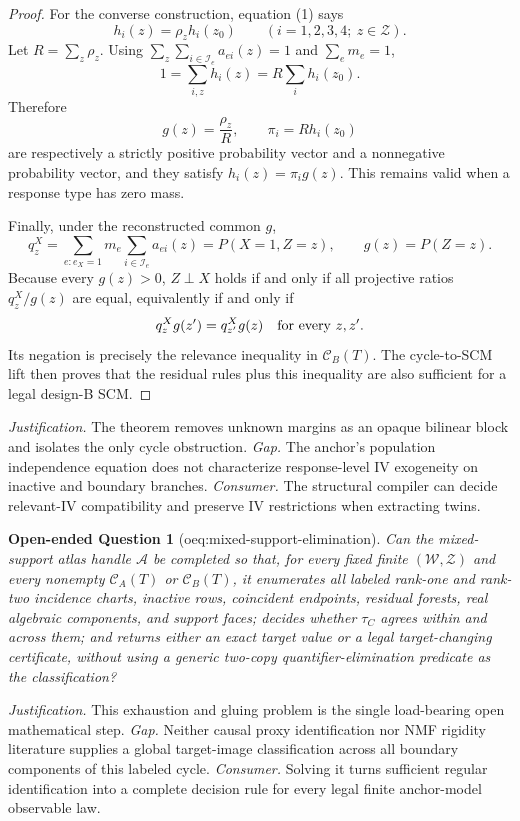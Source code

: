 \documentclass{article}
\newtheorem{openendedquestion}{Open-ended Question}
\begin{document}
\begin{proof}
For the converse construction, equation (1) says
\[
h_i(z)=\rho_z h_i(z_0)\qquad(i=1,2,3,4;\ z\in\mathcal Z).
\]
Let \(R=\sum_z\rho_z\).  Using \(\sum_z\sum_{i\in\mathcal I_e}a_{ei}(z)=1\) and \(\sum_em_e=1\),
\[
1=\sum_{i,z}h_i(z)=R\sum_i h_i(z_0).
\]
Therefore
\[
g(z)=\frac{\rho_z}{R},
\qquad
\pi_i=R h_i(z_0)
\]
are respectively a strictly positive probability vector and a nonnegative probability vector, and they satisfy \(h_i(z)=\pi_i g(z)\).  This remains valid when a response type has zero mass.

Finally, under the reconstructed common \(g\),
\[
q^X_z=\sum_{e:e_X=1}m_e\sum_{i\in\mathcal I_e}a_{ei}(z)
=P(X=1,Z=z),
\qquad g(z)=P(Z=z).
\]
Because every \(g(z)>0\), \(Z\perp X\) holds if and only if all projective ratios \(q^X_z/g(z)\) are equal, equivalently if and only if
\[
q^X_zg(z')=q^X_{z'}g(z)
\quad\hbox{for every }z,z'.
\]
Its negation is precisely the relevance inequality in \(\mathcal C_B(T)\).  The cycle-to-SCM lift then proves that the residual rules plus this inequality are also sufficient for a legal design-B SCM.
\end{proof}
\par\smallskip\noindent \textit{Justification.} The theorem removes unknown margins as an opaque bilinear block and isolates the only cycle obstruction. \textit{Gap.} The anchor's population independence equation does not characterize response-level IV exogeneity on inactive and boundary branches. \textit{Consumer.} The structural compiler can decide relevant-IV compatibility and preserve IV restrictions when extracting twins.

\begin{openendedquestion}[oeq:mixed-support-elimination]\label{oeq:mixed-support-elimination}
Can the mixed-support atlas handle \(\mathscr A\) be completed so that, for every fixed finite \((\mathcal W,\mathcal Z)\) and every nonempty \(\mathcal C_A(T)\) or \(\mathcal C_B(T)\), it enumerates all labeled rank-one and rank-two incidence charts, inactive rows, coincident endpoints, residual forests, real algebraic components, and support faces; decides whether \(\tau_C\) agrees within and across them; and returns either an exact target value or a legal target-changing certificate, without using a generic two-copy quantifier-elimination predicate as the classification?
\end{openendedquestion}
\par\smallskip\noindent \textit{Justification.} This exhaustion and gluing problem is the single load-bearing open mathematical step. \textit{Gap.} Neither causal proxy identification nor NMF rigidity literature supplies a global target-image classification across all boundary components of this labeled cycle. \textit{Consumer.} Solving it turns sufficient regular identification into a complete decision rule for every legal finite anchor-model observable law.
\end{document}
